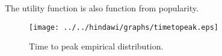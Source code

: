 
The utility function is also function from popularity.

\begin{figure}[!t]
\begin{center}
\texttt{[image: ../../hindawi/graphs/timetopeak.eps]}
\end{center}
\caption{Time to peak empirical distribution.}
\label{fig:timetopeak}
\end{figure} 

